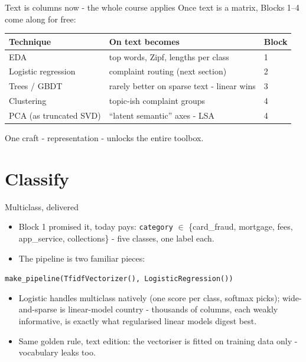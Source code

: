 \documentclass[10pt,aspectratio=169]{beamer}
\begin{document}
\begin{frame}{Text is columns now - the whole course applies}
  Once text is a matrix, Blocks 1--4 come along for free:
  \small
  \begin{center}
  \begin{tabular}{@{}lll@{}}
    \toprule
    Technique & On text becomes & Block \\
    \midrule
    EDA & top words, Zipf, lengths per class & 1 \\
    Logistic regression & complaint routing (next section) & 2 \\
    Trees / GBDT & rarely better on sparse text - linear wins & 3 \\
    Clustering & topic-ish complaint groups & 4 \\
    PCA (as truncated SVD) & ``latent semantic'' axes - LSA & 4 \\
    \bottomrule
  \end{tabular}
  \end{center}
  \vspace{0.5em}
  \begin{center}
    One craft - representation - unlocks the entire toolbox.
  \end{center}
\end{frame}

\section{Classify}

\begin{frame}{Multiclass, delivered}
  \begin{itemize}
    \item Block 1 promised it, today pays: \texttt{category} $\in$
          \{card\_fraud, mortgage, fees, app\_service, collections\} -
          \alert{five classes}, one label each.
    \item The pipeline is two familiar pieces:
  \end{itemize}
  \vspace{0.3em}
  \begin{center}\small
    \texttt{make\_pipeline(TfidfVectorizer(), LogisticRegression())}
  \end{center}
  \vspace{0.3em}
  \begin{itemize}
    \item Logistic handles multiclass natively (one score per class,
          softmax picks); wide-and-sparse is \alert{linear-model country}
          - thousands of columns, each weakly informative, is exactly
          what regularised linear models digest best.
    \item Same golden rule, text edition: the vectoriser is \alert{fitted
          on training data only} - vocabulary leaks too.
  \end{itemize}
\end{frame}
\end{document}
